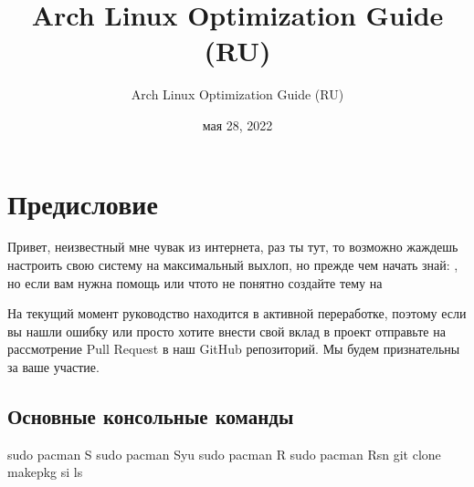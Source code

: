 \documentclass[letterpaper,10pt,russian,openany]{sphinxmanual}
\title{Arch Linux Optimization Guide (RU)}
\date{мая 28, 2022}
\author{Arch Linux Optimization Guide (RU)}
\begin{document}
\pagestyle{empty}
\sphinxmaketitle
\pagestyle{plain}
\sphinxtableofcontents
\pagestyle{normal}
\label{\detokenize{index::doc}}


\sphinxstepscope


\chapter{Предисловие}
\label{\detokenize{source/preface:preface}}\label{\detokenize{source/preface:id1}}\label{\detokenize{source/preface::doc}}
\sphinxAtStartPar
Привет, неизвестный мне чувак из интернета, раз ты тут,
то возможно жаждешь настроить свою систему на максимальный выхлоп, но прежде чем начать \sphinxhyphen{} знай:
,
но если вам нужна помощь или что\sphinxhyphen{}то не понятно  \sphinxhyphen{} создайте тему на 

\sphinxAtStartPar
На текущий момент руководство находится в активной переработке,
поэтому если вы нашли ошибку или просто хотите внести свой вклад в проект \sphinxhyphen{} отправьте на рассмотрение Pull Request в наш GitHub репозиторий.
Мы будем признательны за ваше участие.

\ignorespaces 

\section{Основные консольные команды}
\label{\detokenize{source/preface:basic-commands}}\label{\detokenize{source/preface:index-0}}\label{\detokenize{source/preface:id2}}
\begin{sphinxVerbatim}[commandchars=\\\{\}]
sudo pacman \PYGZhy{}S    
sudo pacman \PYGZhy{}Syu  
sudo pacman \PYGZhy{}R    
sudo pacman \PYGZhy{}Rsn  
git clone         
makepkg \PYGZhy{}si       
                
ls                
\end{sphinxVerbatim}
\end{document}

